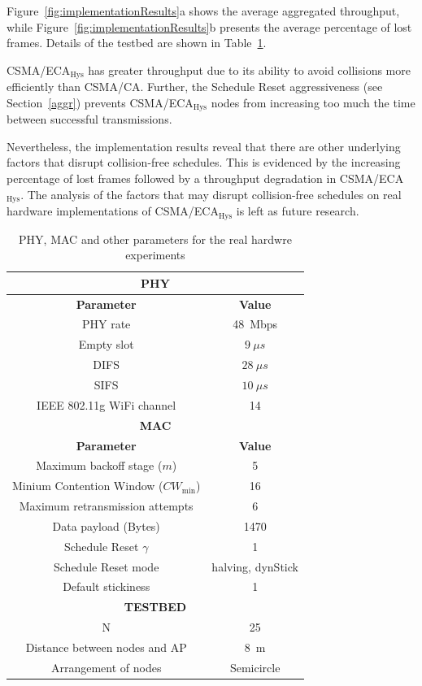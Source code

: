 Figure~\ref{fig:implementationResults}a shows the average aggregated throughput, while Figure~\ref{fig:implementationResults}b presents the average percentage of lost frames. Details of the testbed are shown in Table~\ref{tab:testbed}. 

CSMA/ECA$_{\text{Hys}}$ has greater throughput due to its ability to avoid collisions more efficiently than CSMA/CA. Further, the Schedule Reset aggressiveness (see Section~\ref{aggr}) prevents CSMA/ECA$_{\text{Hys}}$ nodes from increasing too much the time between successful transmissions. 

Nevertheless, the implementation results reveal that there are other underlying factors that disrupt collision-free schedules. This is evidenced by the increasing percentage of lost frames followed by a throughput degradation in CSMA/ECA$_{\text{Hys}}$. The analysis of the factors that may disrupt collision-free schedules on real hardware implementations of CSMA/ECA$_{\text{Hys}}$ is left as future research.


	\begin{table}
		\centering
		\caption{PHY, MAC and other parameters for the real hardwre experiments}
		\label{tab:testbed}
		\begin{tabular}{|c|c|}
			\hline
			\multicolumn{2}{|c|}{{\bfseries PHY}}\\
			\hline
			{\bfseries Parameter} & {\bfseries Value}\\
			\hline
			PHY rate & 48~Mbps\\
			Empty slot & $9~\mu s$\\
			DIFS & $28~\mu s$\\
			SIFS & $10~\mu s$\\
			IEEE 802.11g WiFi channel & 14\\
			\hline
			\multicolumn{2}{|c|}{{\bfseries MAC}}\\
			\hline
			{\bfseries Parameter} & {\bfseries Value}\\
			\hline
			Maximum backoff stage ($m$) & 5\\
			Minium Contention Window ($CW_{\min}$) & 16\\
			Maximum retransmission attempts & 6\\
			Data payload (Bytes) & 1470\\
			Schedule Reset $\gamma$ & 1\\
			Schedule Reset mode & halving, dynStick\\
			Default stickiness & 1\\
			
			\hline
			\multicolumn{2}{|c|}{{\bfseries TESTBED}}\\
			\hline
			N & 25\\
			Distance between nodes and AP & 8~m\\
			Arrangement of nodes & Semicircle\\
			\hline
		\end{tabular}
	\end{table}


